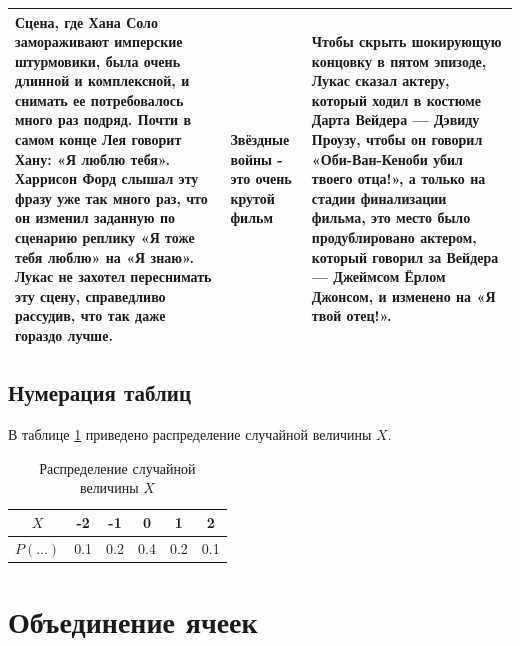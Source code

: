 \documentclass[12pt, a4paper]{article}
\begin{document}
\begin{tabulary}{\textwidth}{|L|J|L|}
	\hline
	Сцена, где Хана Соло замораживают имперские штурмовики, была очень длинной и комплексной, и снимать ее потребовалось много раз подряд. Почти в самом конце Лея говорит Хану: «Я люблю тебя». Харрисон Форд слышал эту фразу уже так много раз, что он изменил заданную по сценарию реплику «Я тоже тебя люблю» на «Я знаю». Лукас не захотел переснимать эту сцену, справедливо рассудив, что так даже гораздо лучше. & Звёздные войны - это очень крутой фильм & Чтобы скрыть шокирующую концовку в пятом эпизоде, Лукас сказал актеру, который ходил в костюме Дарта Вейдера — Дэвиду Проузу, чтобы он говорил «Оби-Ван-Кеноби убил твоего отца!», а только на стадии финализации фильма, это место было продублировано актером, который говорил за Вейдера — Джеймсом Ёрлом Джонсом, и изменено на «Я твой отец!». \\
	\hline
\end{tabulary}



\subsection{Нумерация таблиц}

В таблице \ref{tab:random} приведено распределение случайной величины $X$.

\begin{table}[h!]
\caption{Распределение случайной величины $X$}\label{tab:random}
\begin{center}
\begin{tabular}{|c|c|c|c|c|c|}
\hline
$X$ & -2 & -1 & 0 & 1 & 2 \\
\hline
$P(\ldots)$ & 0.1 & 0.2 & 0.4 & 0.2 & 0.1 \\
\hline
\end{tabular}
\end{center}
\end{table}



\section{Объединение ячеек}
\end{document}
